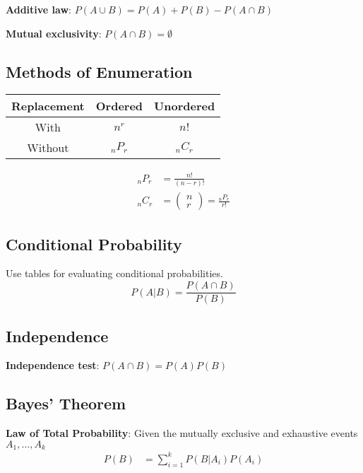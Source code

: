 \documentclass{article}
\begin{document}
\begin{multicols*}{2}
\textbf{Additive law}: $P(A \cup B) = P(A) + P(B) - P(A \cap B)$

\textbf{Mutual exclusivity}: $P(A \cap B) = \emptyset$

\subsection{Methods of Enumeration}

\begin{center}
    \begin{tabular}{|c|c|c|}
        \hline
        Replacement & Ordered    & Unordered  \\ \hline
        With        & $n^r$      & $n!$       \\ \hline
        Without     & ${}_n P_r$ & ${}_n C_r$ \\ \hline
    \end{tabular}
\end{center}
\begin{align*}
    {}_n P_r &= \frac{n!}{(n-r)!} \\
    {}_n C_r &= \begin{pmatrix}
        n \\
        r
    \end{pmatrix} = \frac{{}_n P_r}{r!}
\end{align*}

\subsection{Conditional Probability}
Use tables for evaluating conditional probabilities.
\begin{equation*}
    P(A|B) = \frac{P(A \cap B)}{P(B)}
\end{equation*}

\subsection{Independence}

\textbf{Independence test}: $P(A \cap B) = P(A) P(B)$

\subsection{Bayes' Theorem}

\textbf{Law of Total Probability}: Given the mutually exclusive and exhaustive events $A_1, \ldots, A_k$
\begin{align*}
    P(B) &= \sum_{i = 1}^k P(B|A_i) P(A_i)
\end{align*}


\end{multicols*}
\end{document}
